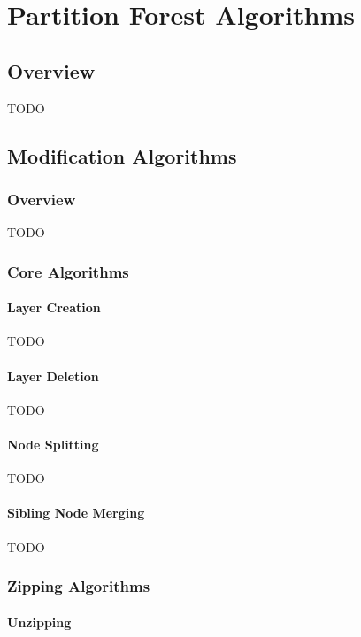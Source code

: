 \section{Partition Forest Algorithms}

\subsection{Overview}

TODO

\subsection{Modification Algorithms}

\subsubsection{Overview}

TODO

\subsubsection{Core Algorithms}

\paragraph{Layer Creation}

TODO

\paragraph{Layer Deletion}

TODO

\paragraph{Node Splitting}

TODO

\paragraph{Sibling Node Merging}

TODO

\subsubsection{Zipping Algorithms}

\paragraph{Unzipping}

